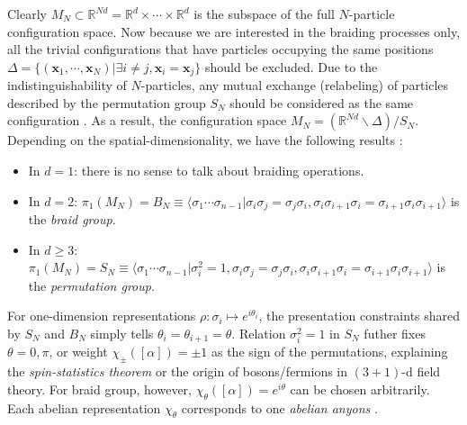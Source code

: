 \begin{itemize}
          Clearly $M_N\subset\mathbb R^{Nd}=\mathbb R^d\times\cdots\times\mathbb R^d$ is the subspace of the full $N$-particle configuration space. Now because we are interested in the braiding processes only, all the trivial configurations that have particles occupying the same positions $\Delta=\{(\bm x_1,\cdots,\bm x_N)|\exists i\neq j, \bm x_i=\bm x_j\}$ should be excluded. Due to the indistinguishability of $N$-particles, any mutual exchange (relabeling) of particles described by the permutation group $S_N$ should be considered as the same configuration . As a result, the configuration space $M_N=(\mathbb R^{Nd}\backslash \Delta)/S_N$. Depending on the spatial-dimensionality, we have the following results \cite{wu1984general}:
          \begin{itemize}
              \item In $d=1$: there is no sense to talk about braiding operations.
              \item In $d=2$: $\pi_1(M_N)=B_N\equiv\langle\sigma_1\cdots\sigma_{n-1}|\sigma_i\sigma_j=\sigma_j\sigma_i,\sigma_i \sigma_{i+1}\sigma_i=\sigma_{i+1}\sigma_i \sigma_{i+1}\rangle$ is the \emph{braid group}.
              \item In $d\geq3$: $\pi_1(M_N)=S_N\equiv\langle\sigma_1\cdots\sigma_{n-1}|\sigma_i^2=1,\sigma_i\sigma_j=\sigma_j\sigma_i,\sigma_i \sigma_{i+1}\sigma_i=\sigma_{i+1}\sigma_i \sigma_{i+1}\rangle$ is the \emph{permutation group}.
          \end{itemize}
          For one-dimension representations $\rho:\sigma_i\mapsto e^{i\theta_i}$, the presentation constraints shared by $S_N$ and $B_N$ simply tells $\theta_i=\theta_{i+1}=\theta$. Relation $\sigma_i^2=1$ in $S_N$ futher fixes $\theta=0,\pi$, or weight $\chi_\pm([\alpha])=\pm1$ as the sign of the permutations, explaining the \emph{spin-statistics theorem} or the origin of bosons/fermions in $(3+1)$-d field theory. For braid group, however, $\chi_\theta([\alpha])=e^{i\theta}$ can be chosen arbitrarily. Each abelian representation $\chi_\theta$ corresponds to one \emph{abelian anyons} \cite{wilczek1982quantum}.


\end{itemize}
